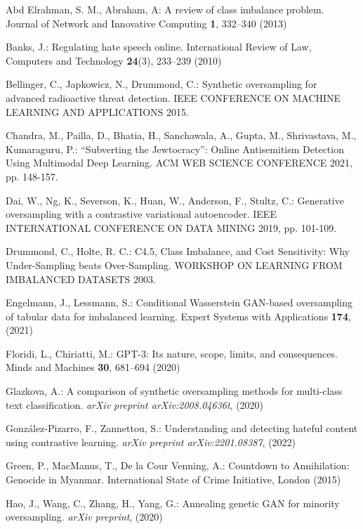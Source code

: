 \documentclass[runningheads]{llncs}
\begin{document}
\begin{thebibliography}{25}
Abd Elrahman, S. M., Abraham, A: A review of class imbalance problem. Journal of Network and Innovative Computing \textbf{1}, 332--340 (2013)

Banks, J.: Regulating hate speech online. International Review of Law, Computers and Technology \textbf{24}(3), 233--239 (2010)

Bellinger, C., Japkowicz, N., Drummond, C.: Synthetic oversampling for advanced radioactive threat detection. IEEE CONFERENCE ON MACHINE LEARNING AND APPLICATIONS 2015.

Chandra, M., Pailla, D., Bhatia, H., Sanchawala, A., Gupta, M., Shrivastava, M., Kumaraguru, P.: ``Subverting the Jewtocracy'': Online Antisemitism Detection Using Multimodal Deep Learning. ACM WEB SCIENCE CONFERENCE 2021, pp. 148-157. 

Dai, W., Ng, K., Severson, K., Huan, W., Anderson, F., Stultz, C.: Generative oversampling with a contrastive variational autoencoder. IEEE INTERNATIONAL CONFERENCE ON DATA MINING 2019, pp. 101-109.

Drummond, C., Holte, R. C.: C4.5, Class Imbalance, and Cost Sensitivity: Why Under-Sampling beats Over-Sampling. WORKSHOP ON LEARNING FROM IMBALANCED DATASETS 2003.

Engelmann, J., Lessmann, S.: Conditional Wasserstein GAN-based oversampling of tabular data for imbalanced learning. Expert Systems with Applications \textbf{174}, (2021)

Floridi, L., Chiriatti, M.: GPT-3: Its nature, scope, limits, and consequences. Minds and Machines \textbf{30}, 681--694 (2020)

Glazkova, A.: A comparison of synthetic oversampling methods for multi-class text classification. \emph{arXiv preprint arXiv:2008.04636t}, (2020)

González-Pizarro, F., Zannettou, S.: Understanding and detecting hateful content using contrastive learning. \emph{arXiv preprint arXiv:2201.08387}, (2022)

Green, P., MacManus, T., De la Cour Venning, A.: Countdown to Annihilation: Genocide in Myanmar. International State of Crime Initiative, London (2015)

Hao, J., Wang, C., Zhang, H., Yang, G.: Annealing genetic GAN for minority oversampling. \emph{arXiv preprint}, (2020)


\end{thebibliography}
\end{document}
